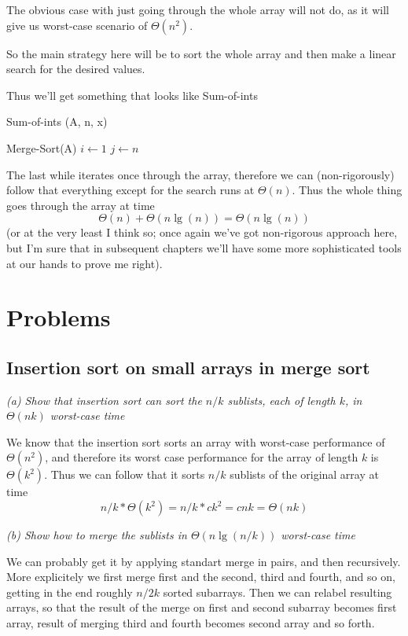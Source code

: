 \documentclass[11pt,oneside,titlepage]{book}
\begin{document}
The obvious case with just going through the whole array will not do, as it will give us
worst-case scenario of $\Theta(n^2)$.

So the main strategy here will be to sort the whole array and then make a linear search for
the desired values.

Thus we'll get something that looks like Sum-of-ints
\begin{function}
  \caption{Sum-of-ints (A, n, x)}
  Merge-Sort(A) \;
  $i \leftarrow 1$\;
  $j \leftarrow n$\;
  
\end{function}

The last while iterates once through the array, therefore we can (non-rigorously) follow that
everything except for the search runs at $\Theta(n)$. Thus the whole thing goes
through the array at time
$$\Theta(n) + \Theta(n \lg(n)) = \Theta(n \lg(n))$$
(or at the very least I think so; once again we've
got non-rigorous approach here, but I'm sure that in subsequent chapters we'll have some
more sophisticated tools at our hands to prove me right).


\section{Problems}

\subsection{Insertion sort on small arrays in merge sort}

\textit{(a) Show that insertion sort can sort the $n/k$ sublists, each of length $k$,
  in $\Theta(nk)$ worst-case time}

We know that the insertion sort sorts an array with worst-case performance of
$\Theta(n^2)$, and therefore its worst case performance for the
array of length $k$ is $\Theta(k^2)$. Thus we can follow that it sorts
$n/k$ sublists of the original array at time
$$n/k * \Theta(k^2) = n/k * ck^2 = cnk = \Theta(nk)$$

\textit{(b) Show how to merge the sublists in $\Theta(n \lg(n/k))$ worst-case
  time}

We can probably get it by applying standart merge in pairs, and then recursively. More
explicitely we first merge first and the second, third and fourth, and so on, getting in the
end roughly $n/2k$ sorted subarrays. Then we can relabel resulting arrays, so that
the result of the merge on first and second subarray becomes first array, result of
merging third and fourth becomes second array and so forth.
\end{document}
